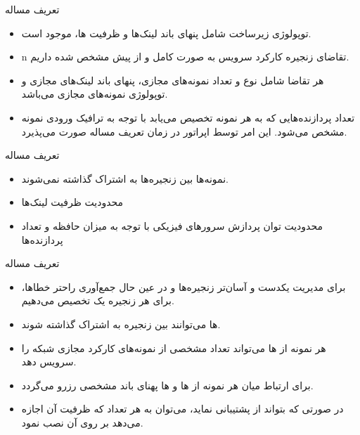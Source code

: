 \documentclass{beamer}
\makeatletter
\newcommand{\RTList}{\raggedleft\rightskip\@totalleftmargin}
\makeatother
\begin{document}
\begin{persian}
\begin{frame}{تعریف مساله} %
    \begin{itemize}\RTList{}
        \item توپولوژی زیرساخت شامل پنهای باند لینک‌ها و ظرفیت ها، موجود است.
        \item n تقاضای زنجیره‌ کارکرد سرویس به صورت کامل و از پیش مشخص شده داریم.
        \item هر تقاضا شامل نوع و تعداد نمونه‌های مجازی، پنهای باند لینک‌های مجازی و توپولوژی
        نمونه‌های مجازی می‌باشد.
        \item تعداد پردازنده‌هایی که به هر نمونه تخصیص می‌یابد با توجه به ترافیک ورودی نمونه مشخص می‌شود.
        این امر توسط اپراتور در زمان تعریف مساله صورت می‌پذیرد.
    \end{itemize}
\end{frame}
\begin{frame}{تعریف مساله} %
    \begin{itemize}\RTList{}
        \item نمونه‌ها بین زنجیره‌ها به اشتراک گذاشته نمی‌شوند.
        \item محدودیت ظرفیت لینک‌ها
        \item محدودیت توان پردازش سرورهای فیزیکی با توجه به میزان حافظه و تعداد پردازنده‌ها
    \end{itemize}
\end{frame}
\begin{frame}{تعریف مساله} %
    \begin{itemize}\RTList{}
        \item برای مدیریت یکدست و آسان‌تر زنجیره‌ها و در عین حال جمع‌آوری راحتر خطاها، برای هر زنجیره یک  تخصیص می‌دهیم.
        \item {}ها می‌توانند بین زنجیره به اشتراک گذاشته شوند.
        \item هر نمونه از ها می‌تواند تعداد مشخصی از نمونه‌های کارکرد مجازی شبکه را سرویس دهد. 
        \item برای ارتباط میان هر نمونه از ها و ها پهنای باند مشخصی رزرو می‌گردد.
        \item در صورتی که  بتواند از  پشتیبانی نماید،
        می‌توان به هر تعداد که ظرفیت آن اجازه می‌دهد بر روی آن  نصب نمود.
    \end{itemize}
\end{frame}

\end{persian}
\end{document}
